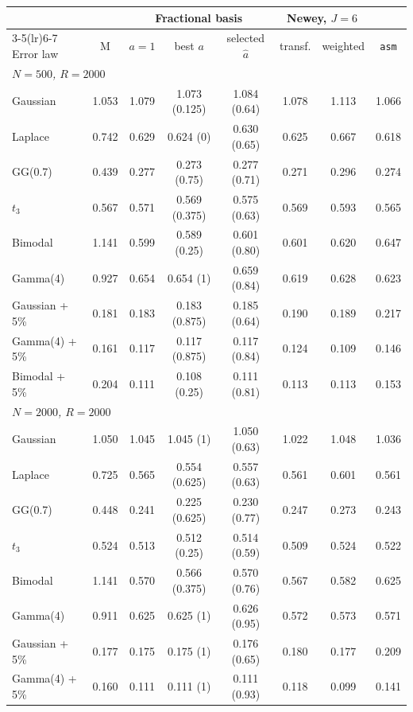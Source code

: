\begin{tabular}{lccccccc}
\toprule
 & & \multicolumn{3}{c}{Fractional basis} & \multicolumn{2}{c}{Newey, $J=6$} & \\
\cmidrule(lr){3-5}\cmidrule(lr){6-7}
Error law & M & $a=1$ & best $a$ & selected $\hat a$ & transf. & weighted & \texttt{asm} \\
\midrule
\multicolumn{8}{l}{\emph{$N=500$, $R=2000$}} \\
Gaussian & 1.053 & 1.079 & 1.073 (0.125) & 1.084 (0.64) & 1.078 & 1.113 & 1.066 \\
Laplace & 0.742 & 0.629 & 0.624 (0) & 0.630 (0.65) & 0.625 & 0.667 & 0.618 \\
GG(0.7) & 0.439 & 0.277 & 0.273 (0.75) & 0.277 (0.71) & 0.271 & 0.296 & 0.274 \\
$t_3$ & 0.567 & 0.571 & 0.569 (0.375) & 0.575 (0.63) & 0.569 & 0.593 & 0.565 \\
Bimodal & 1.141 & 0.599 & 0.589 (0.25) & 0.601 (0.80) & 0.601 & 0.620 & 0.647 \\
Gamma(4) & 0.927 & 0.654 & 0.654 (1) & 0.659 (0.84) & 0.619 & 0.628 & 0.623 \\
Gaussian + 5\% & 0.181 & 0.183 & 0.183 (0.875) & 0.185 (0.64) & 0.190 & 0.189 & 0.217 \\
Gamma(4) + 5\% & 0.161 & 0.117 & 0.117 (0.875) & 0.117 (0.84) & 0.124 & 0.109 & 0.146 \\
Bimodal + 5\% & 0.204 & 0.111 & 0.108 (0.25) & 0.111 (0.81) & 0.113 & 0.113 & 0.153 \\
\multicolumn{8}{l}{\emph{$N=2000$, $R=2000$}} \\
Gaussian & 1.050 & 1.045 & 1.045 (1) & 1.050 (0.63) & 1.022 & 1.048 & 1.036 \\
Laplace & 0.725 & 0.565 & 0.554 (0.625) & 0.557 (0.63) & 0.561 & 0.601 & 0.561 \\
GG(0.7) & 0.448 & 0.241 & 0.225 (0.625) & 0.230 (0.77) & 0.247 & 0.273 & 0.243 \\
$t_3$ & 0.524 & 0.513 & 0.512 (0.25) & 0.514 (0.59) & 0.509 & 0.524 & 0.522 \\
Bimodal & 1.141 & 0.570 & 0.566 (0.375) & 0.570 (0.76) & 0.567 & 0.582 & 0.625 \\
Gamma(4) & 0.911 & 0.625 & 0.625 (1) & 0.626 (0.95) & 0.572 & 0.573 & 0.571 \\
Gaussian + 5\% & 0.177 & 0.175 & 0.175 (1) & 0.176 (0.65) & 0.180 & 0.177 & 0.209 \\
Gamma(4) + 5\% & 0.160 & 0.111 & 0.111 (1) & 0.111 (0.93) & 0.118 & 0.099 & 0.141 \\

\end{tabular}
